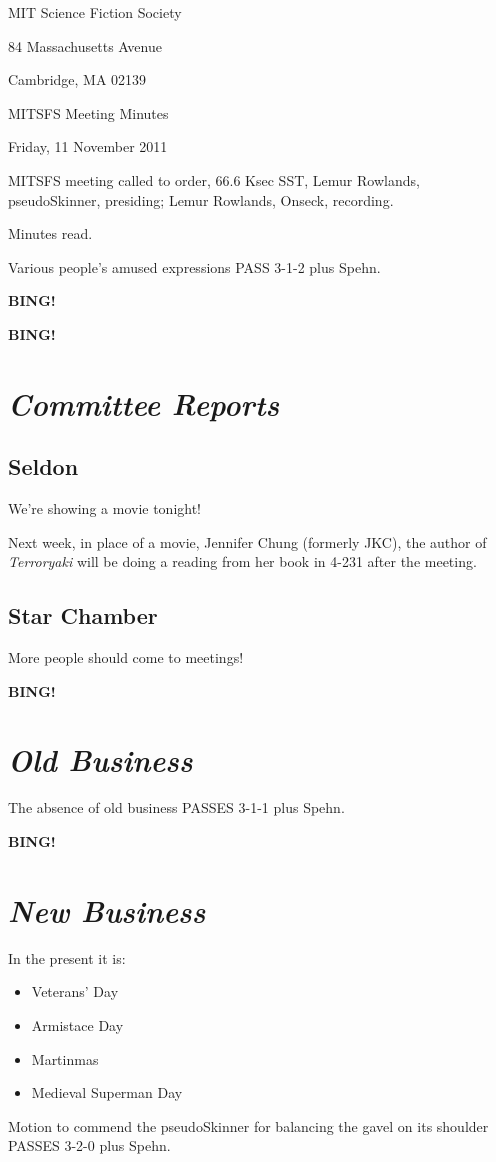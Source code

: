 \documentclass[10pt]{article}
\newcommand{\bing}{{\bf BING!} }
\newcommand{\goto}[1]{\bing \vskip 12pt \section*{{\em{#1}}}}
\newcommand{\ps}{ plus Spehn\xspace}
\newcommand{\skinner}{Lemur Rowlands, pseudoSkinner}
\newcommand{\onseck}{Lemur Rowlands, Onseck}
\newcommand{\meetingdate}{Friday, 11 November 2011}
\begin{document}
\begin{center}

MIT Science Fiction Society

84 Massachusetts Avenue

Cambridge, MA 02139

\vspace{12pt}

MITSFS Meeting Minutes

\meetingdate

\end{center}

\vspace{18pt}

\setlength{\parskip}{6pt}

\noindent
MITSFS meeting called to order, 66.6 Ksec SST,
\skinner, presiding; \onseck, recording.

Minutes read.

Various people's amused expressions PASS 3-1-2\ps.

\bing

\goto{Committee Reports}

\subsection*{Seldon}

We're showing a movie tonight!

Next week, in place of a movie, Jennifer Chung (formerly JKC), the
author of \emph{Terroryaki} will be doing a reading from her book
in 4-231 after the meeting.

\subsection*{Star Chamber}

More people should come to meetings!


\goto{Old Business}

The absence of old business PASSES 3-1-1\ps.


\goto{New Business}

In the present it is:
\begin{itemize}
\item Veterans' Day
\item Armistace Day
\item Martinmas
\item Medieval Superman Day
\end{itemize}

Motion to commend the pseudoSkinner for balancing the gavel on its shoulder
PASSES 3-2-0\ps.
\end{document}
